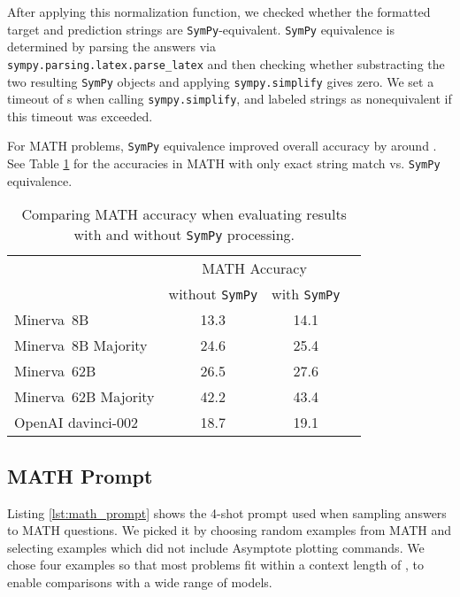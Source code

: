 \documentclass{article}
\newcommand{\ourmodel}[0]{{Minerva~}}
\begin{document}
After applying this normalization function, we checked whether the formatted target and prediction strings are \texttt{SymPy}-equivalent.  \texttt{SymPy} equivalence is determined by parsing the answers via \\
\texttt{sympy.parsing.latex.parse\_latex} and then checking whether substracting the two resulting \texttt{SymPy} objects and applying \texttt{sympy.simplify} gives zero. We set a timeout of s when calling \texttt{sympy.simplify}, and labeled strings as nonequivalent if this timeout was exceeded.

For MATH problems, \texttt{SymPy} equivalence improved overall accuracy by around . See Table \ref{table:sympy_comparison} for the accuracies in MATH with only exact string match vs. \texttt{SymPy} equivalence.
\begin{table}[ht!]
\caption{Comparing MATH accuracy when evaluating results with and without \texttt{SymPy} processing.}
\label{table:sympy_comparison}
\begin{center}
\begin{tabular}{lccc}
\toprule
  &  \multicolumn{2}{c}{MATH Accuracy} \\
\cmidrule(r){2-3}
& without \texttt{SymPy} & with \texttt{SymPy}  \\
\midrule
\ourmodel 8B            & 13.3  & 14.1  \\
\ourmodel 8B Majority   & 24.6  & 25.4 \\
\ourmodel 62B           & 26.5  & 27.6 \\
\ourmodel 62B Majority  & 42.2  & 43.4 \\
OpenAI davinci-002              & 18.7  & 19.1 \\
\bottomrule
\end{tabular}
\end{center}
\end{table}

\newpage
\subsection{MATH Prompt}
\label{appendix:math_prompt}

Listing \ref{lst:math_prompt} shows the 4-shot prompt used when sampling answers to MATH questions. We picked it by choosing  random examples from MATH and selecting examples which did not include Asymptote plotting commands. We chose four examples so that most problems fit within a context length of , to enable comparisons with a wide range of models.
\end{document}

